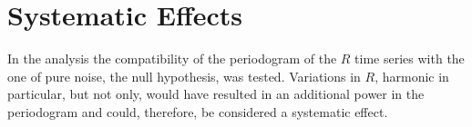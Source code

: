 





\section{Systematic Effects}
In the analysis the compatibility of the periodogram of the $R$ time series with the one of pure noise, the null hypothesis, was tested. Variations in $R$, harmonic in particular, but not only, would have resulted in an additional power in the periodogram and could, therefore, be considered a systematic effect.

